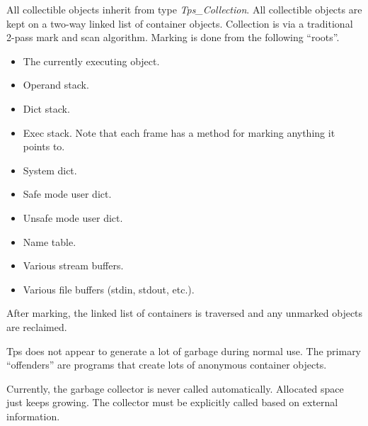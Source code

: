 All collectible objects inherit from type {\em Tps\_Collection}.
All collectible objects are kept on a two-way linked list
of container objects.
Collection is via a traditional 2-pass mark and scan algorithm.
Marking is done from the following ``roots''.
\begin{itemize}
\item The currently executing object.
\item Operand stack.
\item Dict stack.
\item Exec stack.  Note that each frame has a method for
marking anything it points to.
\item System dict.
\item Safe mode user dict.
\item Unsafe mode user dict.
\item Name table.
\item Various stream buffers.
\item Various file buffers (stdin, stdout, etc.).
\end{itemize}
After marking, the linked list of containers is traversed
and any unmarked objects are reclaimed.

Tps does not appear to generate a lot of garbage during normal use.
The primary ``offenders'' are programs that create
lots of anonymous container objects.

Currently, the garbage collector is never called automatically.
Allocated space just keeps growing.  The collector must be explicitly
called based on external information.


